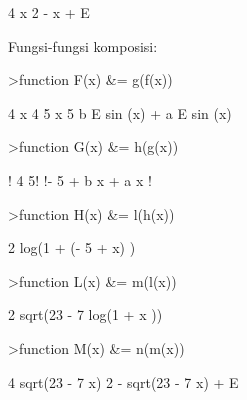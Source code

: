 \documentclass[a4paper,11pt,oneside,enabledeprecatedfontcommands]{scrbook}
\newenvironment{eulernotebook}{}{}
\newenvironment{eulercomment}{\par\medskip\noindent}{\par\medskip}
\begin{document}
\begin{eulernotebook}
\begin{euleroutput}
                                                        4 x
                                               2 - x + E
  
\end{euleroutput}
\begin{eulercomment}
Fungsi-fungsi komposisi:
\end{eulercomment}
\begin{eulerprompt}
>function F(x) &= g(f(x))
\end{eulerprompt}
\begin{euleroutput}
  
                                        4 x    4         5 x    5
                                     b E    sin (x) + a E    sin (x)
  
\end{euleroutput}
\begin{eulerprompt}
>function G(x) &= h(g(x))
\end{eulerprompt}
\begin{euleroutput}
  
                                           !         4      5!
                                           !- 5 + b x  + a x !
  
\end{euleroutput}
\begin{eulerprompt}
>function H(x) &= l(h(x))
\end{eulerprompt}
\begin{euleroutput}
  
                                                            2
                                           log(1 + (- 5 + x) )
  
\end{euleroutput}
\begin{eulerprompt}
>function L(x) &= m(l(x))
\end{eulerprompt}
\begin{euleroutput}
  
                                                              2
                                         sqrt(23 - 7 log(1 + x ))
  
\end{euleroutput}
\begin{eulerprompt}
>function M(x) &= n(m(x))
\end{eulerprompt}
\begin{euleroutput}
  
                                                        4 sqrt(23 - 7 x)
                                  2 - sqrt(23 - 7 x) + E
  

\end{euleroutput}
\end{eulernotebook}
\end{document}

